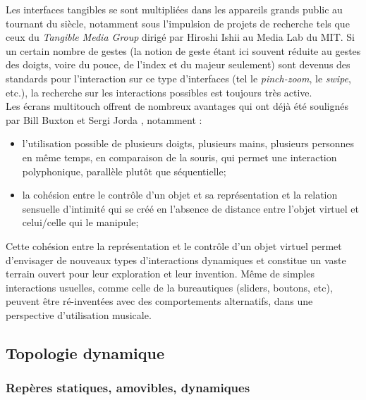 \noindent Les interfaces tangibles se sont multipliées dans les appareils grands public au tournant du siècle, notamment sous l'impulsion de projets de recherche tels que ceux du \textit{Tangible Media Group} dirigé par Hiroshi Ishii au Media Lab du \gls{MIT}. Si un certain nombre de gestes (la notion de geste étant ici souvent réduite au gestes des doigts, voire du pouce, de l'index et du majeur seulement) sont devenus des standards pour l'interaction sur ce type d'interfaces (tel le \textit{pinch-zoom}, le \textit{swipe}, etc.), la recherche sur les interactions possibles est toujours très active.\\
\indent Les écrans multitouch offrent de nombreux avantages qui ont déjà été soulignés par Bill Buxton \cite{buxton_multi-touch_2007} et Sergi Jorda \cite{jorda_digital_2005}, notamment :
\vspace{-1em}
\begin{itemize}[noitemsep]
	\item l'utilisation possible de plusieurs doigts, plusieurs mains, plusieurs personnes en même temps, en comparaison de la souris, qui permet une interaction polyphonique, parallèle plutôt que séquentielle;
	\item la cohésion entre le contrôle d'un objet et sa représentation et la relation sensuelle d'intimité qui se créé en l'absence de distance entre l'objet virtuel et celui/celle qui le manipule;
\end{itemize}

\indent Cette cohésion entre la représentation et le contrôle d'un objet virtuel permet d'envisager de nouveaux types d'interactions dynamiques et constitue un vaste terrain ouvert pour leur exploration et leur invention. Même de simples interactions usuelles, comme celle de la bureautiques (sliders, boutons, etc), peuvent être ré-inventées avec des comportements alternatifs, dans une perspective d'utilisation musicale.

\subsection{Topologie dynamique}

\subsubsection{Repères statiques, amovibles, dynamiques}

